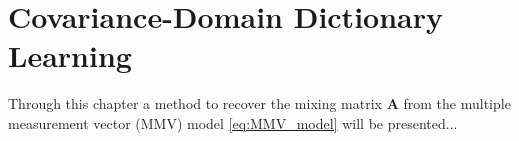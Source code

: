 \chapter{Covariance-Domain Dictionary Learning}\label{ch:Cov-DL}
Through this chapter a method to recover the mixing matrix $\mathbf{A}$ from the multiple measurement vector (MMV) model \eqref{eq:MMV_model} will be presented...



